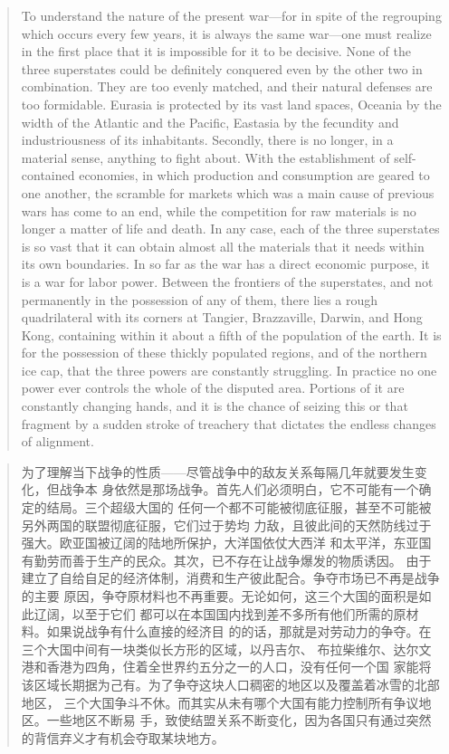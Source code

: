 \begin{paracol}{2}
\switchcolumn*

\begin{quotation}
To understand the nature of the present war---for in spite of the
regrouping which occurs every few years, it is always the same war---one
must realize in the first place that it is impossible for it to be
decisive. None of the three superstates could be definitely conquered
even by the other two in combination. They are too evenly matched, and
their natural defenses are too formidable. Eurasia is protected by its
vast land spaces, Oceania by the width of the Atlantic and the Pacific,
Eastasia by the fecundity and industriousness of its inhabitants.
Secondly, there is no longer, in a material sense, anything to fight
about. With the establishment of self-contained economies, in which
production and consumption are geared to one another, the scramble for
markets which was a main cause of previous wars has come to an end,
while the competition for raw materials is no longer a matter of life
and death. In any case, each of the three superstates is so vast that it
can obtain almost all the materials that it needs within its own
boundaries. In so far as the war has a direct economic purpose, it is a
war for labor power. Between the frontiers of the superstates, and not
permanently in the possession of any of them, there lies a rough
quadrilateral with its corners at Tangier, Brazzaville, Darwin, and Hong
Kong, containing within it about a fifth of the population of the earth.
It is for the possession of these thickly populated regions, and of the
northern ice cap, that the three powers are constantly struggling. In
practice no one power ever controls the whole of the disputed area.
Portions of it are constantly changing hands, and it is the chance of
seizing this or that fragment by a sudden stroke of treachery that
dictates the endless changes of alignment.
\end{quotation}

\switchcolumn

\begin{quotation}
为了理解当下战争的性质——尽管战争中的敌友关系每隔几年就要发生变化，但战争本
身依然是那场战争。首先人们必须明白，它不可能有一个确定的结局。三个超级大国的
任何一个都不可能被彻底征服，甚至不可能被另外两国的联盟彻底征服，它们过于势均
力敌，且彼此间的天然防线过于强大。欧亚国被辽阔的陆地所保护，大洋国依仗大西洋
和太平洋，东亚国有勤劳而善于生产的民众。其次，已不存在让战争爆发的物质诱因。
由于建立了自给自足的经济体制，消费和生产彼此配合。争夺市场已不再是战争的主要
原因，争夺原材料也不再重要。无论如何，这三个大国的面积是如此辽阔，以至于它们
都可以在本国国内找到差不多所有他们所需的原材料。如果说战争有什么直接的经济目
的的话，那就是对劳动力的争夺。在三个大国中间有一块类似长方形的区域，以丹吉尔、
布拉柴维尔、达尔文港和香港为四角，住着全世界约五分之一的人口，没有任何一个国
家能将该区域长期据为己有。为了争夺这块人口稠密的地区以及覆盖着冰雪的北部地区，
三个大国争斗不休。而其实从未有哪个大国有能力控制所有争议地区。一些地区不断易
手，致使结盟关系不断变化，因为各国只有通过突然的背信弃义才有机会夺取某块地方。
\end{quotation}


\end{paracol}

